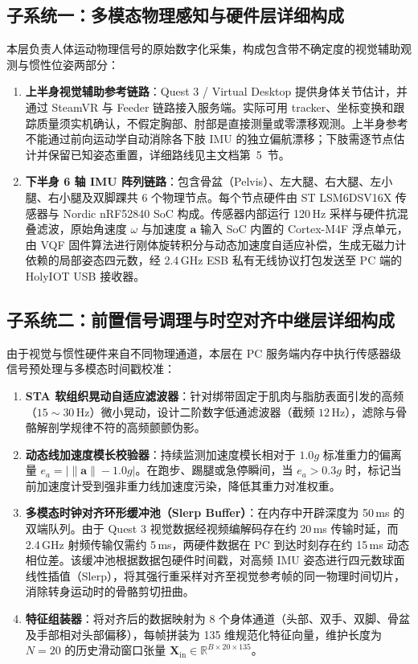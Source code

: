 \documentclass[UTF8,11pt,a4paper]{ctexart}
\begin{document}
\subsection{子系统一：多模态物理感知与硬件层详细构成}
本层负责人体运动物理信号的原始数字化采集，构成包含带不确定度的视觉辅助观测与惯性位姿两部分：
\begin{enumerate}
    \item \textbf{上半身视觉辅助参考链路}：Quest 3 / Virtual Desktop 提供身体关节估计，并通过 SteamVR 与 Feeder 链路接入服务端。实际可用 tracker、坐标变换和跟踪质量须实机确认，不假定胸部、肘部是直接测量或零漂移观测。上半身参考不能通过前向运动学自动消除各下肢 IMU 的独立偏航漂移；下肢需逐节点估计并保留已知姿态重置，详细路线见主文档第~5~节。
    \item \textbf{下半身 6 轴 IMU 阵列链路}：包含骨盆（Pelvis）、左大腿、右大腿、左小腿、右小腿及双脚踝共 6 个物理节点。每个节点硬件由 ST LSM6DSV16X 传感器与 Nordic nRF52840 SoC 构成。传感器内部运行 120\,Hz 采样与硬件抗混叠滤波，原始角速度 $\omega$ 与加速度 $\mathbf{a}$ 输入 SoC 内置的 Cortex-M4F 浮点单元，由 VQF 固件算法进行刚体旋转积分与动态加速度自适应补偿，生成无磁力计依赖的局部姿态四元数，经 2.4\,GHz ESB 私有无线协议打包发送至 PC 端的 HolyIOT USB 接收器。
\end{enumerate}

\subsection{子系统二：前置信号调理与时空对齐中继层详细构成}
由于视觉与惯性硬件来自不同物理通道，本层在 PC 服务端内存中执行传感器级信号预处理与多模态时间戳校准：
\begin{enumerate}
    \item \textbf{STA 软组织晃动自适应滤波器}：针对绑带固定于肌肉与脂肪表面引发的高频（$15\sim30$\,Hz）微小晃动，设计二阶数字低通滤波器（截频 $12$\,Hz），滤除与骨骼解剖学规律不符的高频颤颤伪影。
    \item \textbf{动态线加速度模长校验器}：持续监测加速度模长相对于 $1.0g$ 标准重力的偏离量 $e_a = \big|\|\mathbf{a}\| - 1.0g\big|$。在跑步、踢腿或急停瞬间，当 $e_a > 0.3g$ 时，标记当前加速度计受到强非重力线加速度污染，降低其重力对准权重。
    \item \textbf{多模态时钟对齐环形缓冲池（Slerp Buffer）}：在内存中开辟深度为 50\,ms 的双端队列。由于 Quest 3 视觉数据经视频编解码存在约 20\,ms 传输时延，而 2.4\,GHz 射频传输仅需约 5\,ms，两硬件数据在 PC 到达时刻存在约 15\,ms 动态相位差。该缓冲池根据数据包硬件时间戳，对高频 IMU 姿态进行四元数球面线性插值（Slerp），将其强行重采样对齐至视觉参考帧的同一物理时间切片，消除转身运动时的骨骼剪切扭曲。
    \item \textbf{特征组装器}：将对齐后的数据映射为 8 个身体通道（头部、双手、双脚、骨盆及手部相对头部偏移），每帧拼装为 135 维规范化特征向量，维护长度为 $N=20$ 的历史滑动窗口张量 $\mathbf{X}_{\text{in}} \in \mathbb{R}^{B \times 20 \times 135}$。
\end{enumerate}
\end{document}
